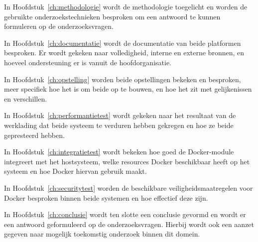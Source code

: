 In Hoofdstuk~\ref{ch:methodologie} wordt de methodologie toegelicht en worden de gebruikte onderzoekstechnieken besproken om een antwoord te kunnen formuleren op de onderzoeksvragen.

In Hoofdstuk~\ref{ch:documentatie} wordt de documentatie van beide platformen besproken. Er wordt gekeken naar volledigheid, interne en externe bronnen, en hoeveel ondersteuning er is vanuit de hoofdorganisatie.

In Hoofdstuk~\ref{ch:opstelling} worden beide opstellingen bekeken en besproken, meer specifiek hoe het is om beide op te bouwen, en hoe het zit met gelijkenissen en verschillen.

In Hoofdstuk~\ref{ch:performantietest} wordt gekeken naar het resultaat van de werklading dat beide systeem te verduren hebben gekregen en hoe ze beide gepresteerd hebben.

In Hoofdstuk~\ref{ch:integratietest} wordt bekeken hoe goed de Docker-module integreert met het hostsysteem, welke resources Docker beschikbaar heeft op het systeem en hoe Docker hiervan gebruik maakt.

In Hoofdstuk~\ref{ch:securitytest} worden de beschikbare veiligheidsmaatregelen voor Docker besproken binnen beide systemen en hoe effectief deze zijn.

In  Hoofdstuk~\ref{ch:conclusie} wordt ten slotte een conclusie gevormd en wordt er een antwoord geformuleerd op de onderzoeksvragen. Hierbij wordt ook een aanzet gegeven naar mogelijk toekomstig onderzoek binnen dit domein.

